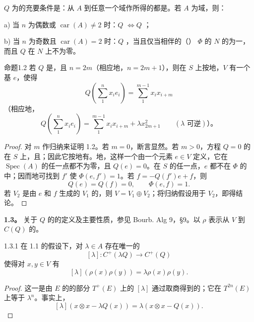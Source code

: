 $Q$ 为的充要条件是：从 $A$ 到任意一个域作所得的都是。若 $A$ 为域，则：

\noindent a) 当 $n$ 为偶数或 $\operatorname{car}(A)\ne2$ 时：$Q$  $\Longleftrightarrow Q$ ；

\noindent b) 当 $n$ 为奇数且 $\operatorname{car}(A)=2$ 时：$Q$ ，当且仅当相伴的（） $\Phi$ 的 $N$ 的为一，而且 $Q$ 在 $N$ 上不为零。

\begin{SGAresult}{命题}{1.2}
若 $Q$ 是，且 $n=2m$（相应地，$n=2m+1$），则在 $S$ 上按地，$V$ 有一个基 $e$，使得
\[
Q\left(\sum_{1}^{n}x_ie_i\right)=\sum_{1}^{m-1}x_ix_{i+m}
\]
（相应地，
\[
Q\left(\sum_{1}^{n}x_ie_i\right)=\sum_{1}^{m-1}x_ix_{i+m}+\lambda x_{2m+1}^{2}\qquad(\lambda\text{ 可逆})\text{）。}
\]
\end{SGAresult}
\begin{proof}
对 $m$ 作归纳来证明 1.2。若 $m=0$，断言显然。若 $m>0$，方程 $Q=0$ 的在 $S$ 上，且；因此它按地有。地，这样一个由一个元素 $e\in V$ 定义，它在 $\operatorname{Spec}(A)$ 的任一点都不为零，且 $Q(e)=0$。在 $S$ 的任一点，$e$ 都不在 $\Phi$ 的中；因而地可找到 $f'$ 使 $\Phi(e,f')=1$。若 $f=-Q(f')e+f$，则
\[
Q(e)=Q(f)=0,\qquad\Phi(e,f)=1.
\]
若 $V_2$ 是由 $e$ 和 $f$ 生成的 $V_1$ 的，则 $V=V_1\oplus V_2$；将归纳假设用于 $V_2$，即得结论。
\end{proof}

\textbf{1.3。} 关于 $Q$ 的的定义及主要性质，参见 Bourb. Alg 9，§9。以 $\rho$ 表示从 $V$ 到 $C(Q)$ 的。

\begin{SGAresult}{}{1.3.1}
在 1.1 的假设下，对 $\lambda\in A$ 存在唯一的
\[
[\lambda]:C^+(\lambda Q)\longrightarrow C^+(Q)
\]
使得对 $x,y\in V$ 有
\[
[\lambda](\rho(x)\rho(y))=\lambda\rho(x)\rho(y).
\]
\end{SGAresult}
\begin{proof}
这一是由 $E$ 的的部分 $T^+(E)$ 上的 $[\lambda]$ 通过取商得到的；它在 $T^{2n}(E)$ 上等于 $\lambda^n$。事实上，
\[
[\lambda](x\otimes x-\lambda Q(x))=\lambda(x\otimes x-Q(x)).
\]
\end{proof}

